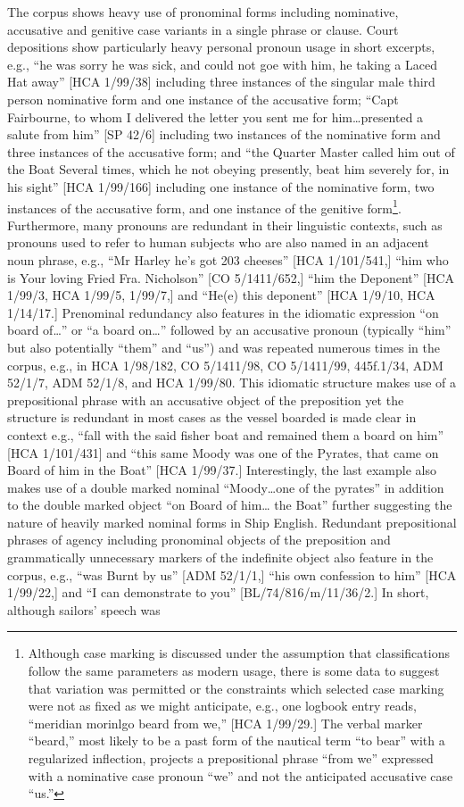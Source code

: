 \documentclass[12pt]{article}
\newenvironment{styleStandard}{\renewcommand\baselinestretch{1.0}\setlength\leftskip{0cm}\setlength\rightskip{0cm plus 1fil}\setlength\parindent{0cm}\setlength\parfillskip{0pt plus 1fil}\setlength\parskip{0in plus 1pt}\writerlistparindent\writerlistleftskip\leavevmode\normalfont\normalsize\writerlistlabel\ignorespaces}{\unskip\vspace{0in plus 1pt}\par}
\newcommand\writerlistleftskip{}
\newcommand\writerlistparindent{}
\newcommand\writerlistlabel{}
\begin{document}
\begin{styleStandard}
The corpus shows heavy use of pronominal forms including nominative, accusative and genitive case variants in a single phrase or clause. Court depositions show particularly heavy personal pronoun usage in short excerpts, e.g., “he was sorry he was sick, and could not goe with him, he taking a Laced Hat away” [HCA 1/99/38] including three instances of the singular male third person nominative form and one instance of the accusative form; “Capt Fairbourne, to whom I delivered the letter you sent me for him…presented a salute from him” [SP 42/6] including two instances of the nominative form and three instances of the accusative form; and “the Quarter Master called him out of the Boat Several times, which he not obeying presently, beat him severely for, in his sight” [HCA 1/99/166] including one instance of the nominative form, two instances of the accusative form, and one instance of the genitive form\footnote{ Although case marking is discussed under the assumption that classifications follow the same parameters as modern usage, there is some data to suggest that variation was permitted or the constraints which selected case marking were not as fixed as we might anticipate, e.g., one logbook entry reads, “meridian morinlgo beard from we,” [HCA 1/99/29.] The verbal marker “beard,” most likely to be a past form of the nautical term “to bear” with a regularized inflection, projects a prepositional phrase “from we” expressed with a nominative case pronoun “we” and not the anticipated accusative case “us.” }. Furthermore, many pronouns are redundant in their linguistic contexts, such as pronouns used to refer to human subjects who are also named in an adjacent noun phrase, e.g., “Mr Harley he’s got 203 cheeses” [HCA 1/101/541,] “him who is Your loving Fried Fra. Nicholson” [CO 5/1411/652,] “him the Deponent” [HCA 1/99/3, HCA 1/99/5, 1/99/7,] and “He(e) this deponent” [HCA 1/9/10, HCA 1/14/17.] Prenominal redundancy also features in the idiomatic expression “on board of…” or “a board on…” followed by an accusative pronoun (typically “him” but also potentially “them” and “us”) and was repeated numerous times in the corpus, e.g., in HCA 1/98/182, CO 5/1411/98, CO 5/1411/99, 445f.1/34, ADM 52/1/7, ADM 52/1/8, and HCA 1/99/80. This idiomatic structure makes use of a prepositional phrase with an accusative object of the preposition yet the structure is redundant in most cases as the vessel boarded is made clear in context e.g., “fall with the said fisher boat and remained them a board on him” [HCA 1/101/431] and “this same Moody was one of the Pyrates, that came on Board of him in the Boat” [HCA 1/99/37.] Interestingly, the last example also makes use of a double marked nominal “Moody…one of the pyrates” in addition to the double marked object “on Board of him… the Boat” further suggesting the nature of heavily marked nominal forms in Ship English. Redundant prepositional phrases of agency including pronominal objects of the preposition and grammatically unnecessary markers of the indefinite object also feature in the corpus, e.g., “was Burnt by us” [ADM 52/1/1,] “his own confession to him” [HCA 1/99/22,] and “I can demonstrate to you” [BL/74/816/m/11/36/2.] In short, although sailors’ speech was 
\end{styleStandard}
\end{document}
